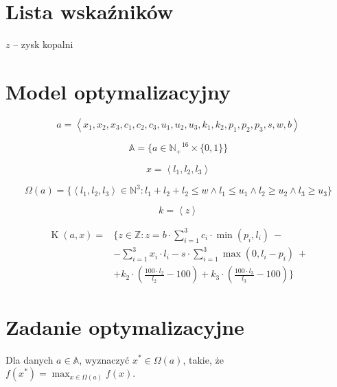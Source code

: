 \documentclass[titlepage]{article}
\begin{document}
\section{Lista wskaźników}
$z$ -- zysk kopalni

\section{Model optymalizacyjny}
\begin{equation}
	a = \left< x_1, x_2, x_3, c_1, c_2, c_3, u_1, u_2, u_3, k_1, k_2, p_1, p_2, p_3, s, w, b \right>
\end{equation}

\begin{equation}
	\mathbb{A} = \{ a \in \mathbb{N_+}^{16} \times \{ 0, 1 \} \}
\end{equation}

\begin{equation}
	x = \left< l_1, l_2, l_3 \right>
\end{equation}

\begin{equation}
	\Omega(a) = \{ \left< l_1, l_2, l_3 \right> \in \mathbb{N}^3 : l_1 + l_2 + l_2 \leq w \land l_1 \leq u_1 \land l_2 \geq u_2 \land l_3 \geq u_3 \}
\end{equation}

\begin{equation}
	k = \left< z \right>
\end{equation}

\begin{equation}
	\begin{aligned}
		\operatorname{K}(a, x) ={} & \{ z \in \mathbb{Z} : z = b \cdot \sum_{i = 1}^3 c_i \cdot \min{(p_i, l_i)} \ -                \\
		                           & - \sum_{i = 1}^3 x_i \cdot l_i - s \cdot \sum_{i = 1}^3 \max{(0, l_i - p_i)} \ +               \\
		                           & + k_2 \cdot (\frac{100 \cdot l_2}{l_2} - 100) + k_3 \cdot (\frac{100 \cdot l_3}{l_3} - 100) \} 
	\end{aligned}
\end{equation}

\section{Zadanie optymalizacyjne}
Dla danych $a \in \mathbb{A}$, wyznaczyć $x^* \in \Omega(a)$, takie, że $f(x^*) = \max_{x \in \Omega(a)}{f(x)}$.
\end{document}
